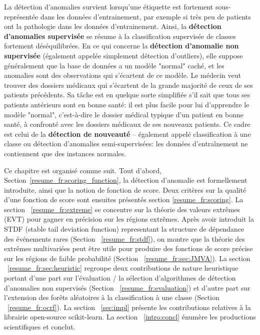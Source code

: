 La détection d'anomalies survient lorsqu'une étiquette est fortement sous-représentée dans les données d'entrainement, par exemple si très peu de patients ont la pathologie dans les données d'entrainement.
Ainsi, la \textbf{détection d'anomalies supervisée} se résume à la classification supervisée de classes fortement déséquilibrées.
En ce qui concerne la \textbf {détection d'anomalie non supervisée} (également appelée simplement détection d'outliers), elle suppose généralement que la base de données a un modèle "normal" caché, et les anomalies sont des observations qui s'écartent de ce modèle. Le médecin veut trouver des dossiers médicaux qui s'écartent de la grande majorité de ceux de ses patients précédents.
%
Sa tâche est en quelque sorte simplifiée s'il sait que tous ses patients antérieurs sont en bonne santé: il est plus facile pour lui d'apprendre le modèle "normal", c'est-à-dire le dossier médical typique d'un patient en bonne santé, à confronté avec les dossiers médicaux de ses nouveaux patients. Ce cadre est celui de la \textbf {détection de nouveauté} -- également appelé classification à une classe ou détection d'anomalies semi-supervisées: les données d'entraînement ne contiennent que des instances normales.

Ce chapitre est organisé comme suit.
Tout d'abord, Section~\ref{resume_fr:scoring_function}, la détection d'anomalie est formellement introduite, ainsi que la notion de fonction de score.
Deux critères sur la qualité d'une fonction de score sont ensuites présentés section \ref{resume_fr:scoring}.
La section ~\ref{resume_fr:extreme} se concentre sur la théorie des valeurs extrêmes (EVT) pour gagner en précision sur les régions extrêmes. Après avoir introduit la STDF (stable tail deviation function) representant la structure de dépendance des événements rares (Section ~\ref{resume_fr:stdf}), on montre que la théorie des extrêmes multivariées peut être utile pour produire des fonctions de score précise sur les régions de faible probabilité (Section ~\ref{resume_fr:sec:JMVA}).
La section ~\ref{resume_fr:sec:heuristic} regroupe deux contributions de nature heuristique portant d'une part sur l'évaluation / la sélection d'algorithmes de détection d'anomalies non supervisés (Section ~\ref{resume_fr:evaluation}) et d'autre part sur l'extension des forêts aléatoires à la classification à une classe (Section ~\ref{resume_fr:ocrf}). La section ~\ref{sec:impl} présente les contributions relatives à la librairie open-source scikit-learn. La section ~\ref{intro:concl} énumère les productions scientifiques et conclut.


